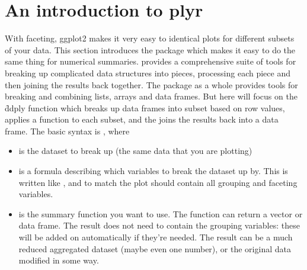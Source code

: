 % 



\section{An introduction to plyr}
\label{sec:plyr}

With faceting, ggplot2 makes it very easy to identical plots for different subsets of your data.  This section introduces the  package which makes it easy to do the same thing for numerical summaries.   provides a comprehensive suite of tools for breaking up complicated data structures into pieces, processing each piece and then joining the results back together.  The  package as a whole provides tools for breaking and combining lists, arrays and data frames.  But here will focus on the \f{ddply} function which breaks up data frames into subset based on row values, applies a function to each subset, and the joins the results back into a data frame.  The basic syntax is , where

\begin{itemize}
  \item {} is the dataset to break up (the same data that you are plotting)
  
  \item {} is a formula describing which variables to break the dataset up by.  This is written like , and to match the plot should contain all grouping and faceting variables.  
  
  \item {} is the summary function you want to use.  The function can return a vector or data frame.  The result does not need to contain the grouping variables: these will be added on automatically if they're needed.  The result can be a much reduced aggregated dataset (maybe even one number), or the original data modified in some way.
\end{itemize}


